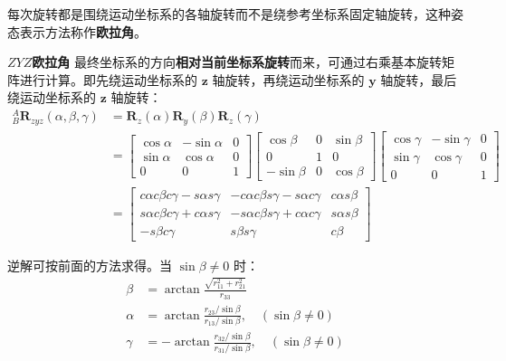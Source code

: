 \documentclass[cn,11pt,chinese,blue,bibstyle=ieeetr]{elegantbook}
\begin{document}
每次旋转都是围绕运动坐标系的各轴旋转而不是绕参考坐标系固定轴旋转，这种姿态表示方法称作\textbf{欧拉角}。

\textbf{$ZYZ$欧拉角} 最终坐标系的方向\textbf{相对当前坐标系旋转}而来，可通过右乘基本旋转矩阵进行计算。即先绕运动坐标系的 $\bm{z}$ 轴旋转，再绕运动坐标系的 $\bm{y}$ 轴旋转，最后绕运动坐标系的 $\bm{z}$ 轴旋转：
\begin{equation}
	\begin{aligned}
		_B^A\bm{R}_{zyz}\left(\alpha, \beta, \gamma\right) &= \bm{R}_z\left(\alpha\right) \bm{R}_y\left(\beta\right) \bm{R}_z\left(\gamma\right) \\
		&=
		\begin{bmatrix}
			\cos\alpha & -\sin\alpha & 0 \\
			\sin\alpha & \cos\alpha  & 0 \\
			0          & 0           & 1
		\end{bmatrix}
		\begin{bmatrix}
			\cos\beta  & 0 & \sin\beta \\
			0           & 1 & 0          \\
			-\sin\beta & 0 & \cos\beta
		\end{bmatrix}
		\begin{bmatrix}
			\cos\gamma & -\sin\gamma & 0 \\
			\sin\gamma & \cos\gamma  & 0 \\
			0          & 0           & 1
		\end{bmatrix} \\
		&=
		\begin{bmatrix}
			c\alpha c\beta c\gamma - s\alpha s\gamma & -c\alpha c\beta s\gamma - s\alpha c\gamma & c\alpha s\beta \\
			s\alpha c\beta c\gamma + c\alpha s\gamma & -s\alpha c\beta s\gamma + c\alpha c\gamma & s\alpha s\beta \\
			-s\beta c\gamma                          & s\beta s\gamma                            & c\beta
		\end{bmatrix}
	\end{aligned}
\end{equation}

逆解可按前面的方法求得。当 $\sin\beta \ne 0$ 时：
\begin{equation}
	\begin{aligned}
		\beta &= \arctan\frac{\sqrt{r_{11}^2+r_{21}^2}}{r_{33}} \\
		\alpha &= \arctan\frac{r_{23}/\sin\beta}{r_{13}/\sin\beta}, \quad (\sin\beta \ne 0) \\
		\gamma &= -\arctan\frac{r_{32}/\sin\beta}{r_{31}/\sin\beta}, \quad (\sin\beta \ne 0)
	\end{aligned}
\end{equation}
\end{document}
